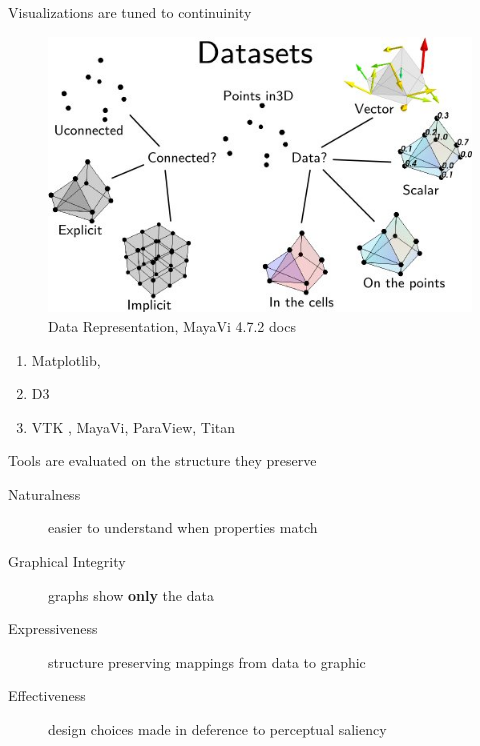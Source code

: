 \documentclass[xcolor={dvipsnames}, handout]{beamer}
\begin{document}
\begin{frame}{Visualizations are tuned to continuinity\cite{toryRethinkingVisualizationHighlevel2004}}
    \begin{figure}
        \includegraphics[height=.5\textheight]{figures/intro/dataset_diagram.png}
        \caption{Data Representation, MayaVi 4.7.2 docs\cite{DataRepresentationMayavi}}
    \end{figure}
    \begin{enumerate}
        \item Matplotlib\cite{hunterMatplotlib2DGraphics2007}, 
        \item D3 \cite{bostockDataDrivenDocuments2011}
        \item VTK \cite{hanwellVisualizationToolkitVTK2015,geveci2012vtk}, MayaVi\cite{RamachandranMayaVI2011}, ParaView\cite{ahrens2005paraview}, Titan\cite{brianwylieUnifiedToolkitInformation2009}
    \end{enumerate}
\end{frame}

\begin{frame}{Tools are evaluated on the structure they preserve}
    \begin{description}
        \item[Naturalness] easier to understand when properties match \cite{norman_things_smart}
        \item[Graphical Integrity] graphs show \textbf{only} the data \cite{tufteVisualDisplayQuantitative2001}
        \item[Expressiveness] structure preserving mappings from data to graphic \cite{mackinlayAutomatingDesignGraphical1986}
        \item[Effectiveness] design choices made in deference to perceptual saliency \cite{clevelandResearchStatisticalGraphics1987,clevelandGraphicalPerceptionTheory1984,chambersGraphicalMethodsData1983a, munznerVisualizationAnalysisDesign2014}
    \end{description}
\end{frame}
\end{document}
